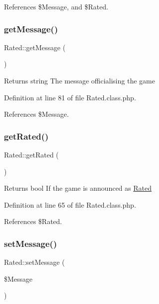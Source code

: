 References \$\+Message, and \$\+Rated.

\mbox{\label{class_rated_a423269207aab7311214b89e2abe5acae}} 
\subsubsection{\texorpdfstring{get\+Message()}{getMessage()}}
{\footnotesize\ttfamily Rated\+::get\+Message (\begin{DoxyParamCaption}{ }\end{DoxyParamCaption})}

\begin{DoxyReturn}{Returns}
string The message officialising the game 
\end{DoxyReturn}


Definition at line 81 of file Rated.\+class.\+php.



References \$\+Message.

\mbox{\label{class_rated_a9c4a34001e20782332eec732ef91201c}} 
\subsubsection{\texorpdfstring{get\+Rated()}{getRated()}}
{\footnotesize\ttfamily Rated\+::get\+Rated (\begin{DoxyParamCaption}{ }\end{DoxyParamCaption})}

\begin{DoxyReturn}{Returns}
bool If the game is announced as \hyperlink{class_rated}{Rated} 
\end{DoxyReturn}


Definition at line 65 of file Rated.\+class.\+php.



References \$\+Rated.

\mbox{\label{class_rated_a7f3cd6e9f485ad6f1a34afdca362f8e4}} 
\subsubsection{\texorpdfstring{set\+Message()}{setMessage()}}
{\footnotesize\ttfamily Rated\+::set\+Message (\begin{DoxyParamCaption}\item[{}]{\$\+Message }\end{DoxyParamCaption})}


